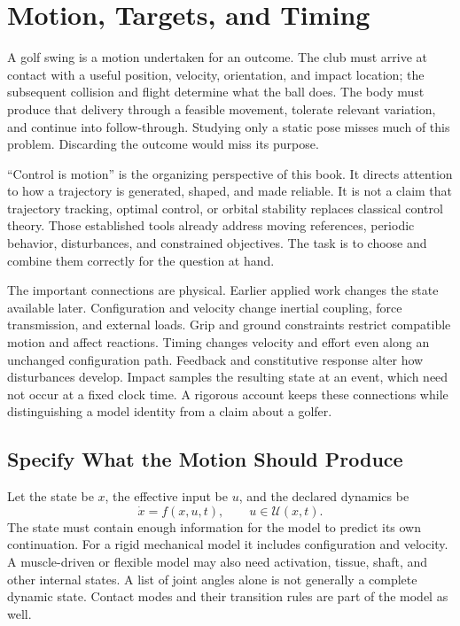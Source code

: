 \chapter{Motion, Targets, and Timing}
\label{ch:throwing_target}

A golf swing is a motion undertaken for an outcome. The club must arrive at
contact with a useful position, velocity, orientation, and impact location;
the subsequent collision and flight determine what the ball does. The body
must produce that delivery through a feasible movement, tolerate relevant
variation, and continue into follow-through. Studying only a static pose
misses much of this problem. Discarding the outcome would miss its purpose.

``Control is motion'' is the organizing perspective of this book. It directs
attention to how a trajectory is generated, shaped, and made reliable. It is
not a claim that trajectory tracking, optimal control, or orbital stability
replaces classical control theory. Those established tools already address
moving references, periodic behavior, disturbances, and constrained objectives.
The task is to choose and combine them correctly for the question at hand.

The important connections are physical. Earlier applied work changes the
state available later. Configuration and velocity change inertial coupling,
force transmission, and external loads. Grip and ground constraints restrict
compatible motion and affect reactions. Timing changes velocity and effort
even along an unchanged configuration path. Feedback and constitutive response
alter how disturbances develop. Impact samples the resulting state at an event,
which need not occur at a fixed clock time. A rigorous account keeps these
connections while distinguishing a model identity from a claim about a golfer.

\section{Specify What the Motion Should Produce}

Let the state be $x$, the effective input be $u$, and the declared dynamics be
\begin{equation}
 \dot x=f(x,u,t),\qquad u\in\mathcal U(x,t).
 \label{eq:nonlinear_sys}
\end{equation}
The state must contain enough information for the model to predict its own
continuation. For a rigid mechanical model it includes configuration and
velocity. A muscle-driven or flexible model may also need activation, tissue,
shaft, and other internal states. A list of joint angles alone is not generally
a complete dynamic state. Contact modes and their transition rules are part
of the model as well.

